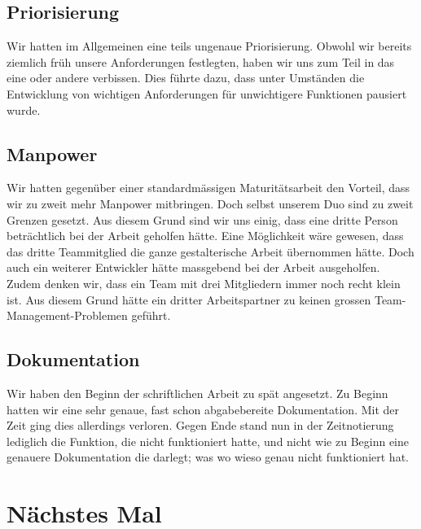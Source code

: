 \subsection*{Priorisierung}
Wir hatten im Allgemeinen eine teils ungenaue Priorisierung. Obwohl wir bereits ziemlich früh unsere Anforderungen festlegten, haben wir uns zum Teil in das eine oder andere verbissen.
Dies führte dazu, dass unter Umständen die Entwicklung von wichtigen Anforderungen für unwichtigere Funktionen pausiert wurde. 


\subsection*{Manpower} \label{subsec:neusm}
Wir hatten gegenüber einer standardmässigen Maturitätsarbeit den Vorteil, dass wir zu zweit mehr Manpower mitbringen. Doch selbst unserem Duo sind zu zweit Grenzen gesetzt.
Aus diesem Grund sind wir uns einig, dass eine dritte Person beträchtlich bei der Arbeit geholfen hätte. Eine Möglichkeit wäre gewesen, dass das dritte Teammitglied die ganze
gestalterische Arbeit übernommen hätte. Doch auch ein weiterer Entwickler hätte massgebend bei der Arbeit ausgeholfen. Zudem denken wir, dass ein Team mit drei Mitgliedern
immer noch recht klein ist. Aus diesem Grund hätte ein dritter Arbeitspartner zu keinen grossen Team-Management-Problemen geführt.


\subsection*{Dokumentation}
Wir haben den Beginn der schriftlichen Arbeit zu spät angesetzt. Zu Beginn hatten wir eine sehr genaue, fast schon abgabebereite Dokumentation. Mit der Zeit ging dies allerdings verloren.
Gegen Ende stand nun in der Zeitnotierung lediglich die Funktion, die nicht funktioniert hatte, und nicht wie zu Beginn eine genauere Dokumentation die darlegt; was wo wieso genau nicht funktioniert hat.

\section{Nächstes Mal}


